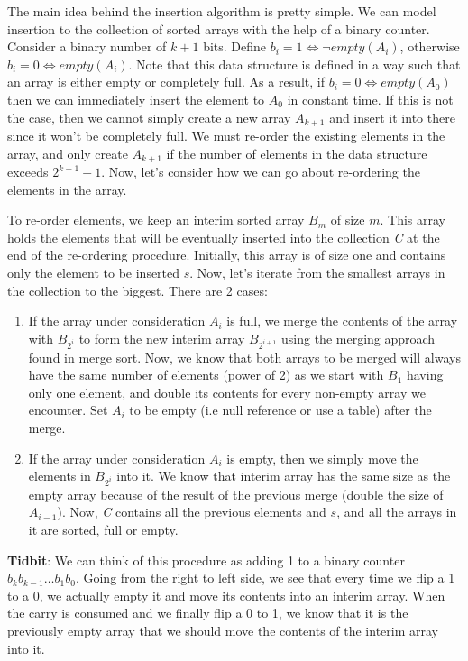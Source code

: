 \documentclass{article}
\begin{document}
The main idea behind the insertion algorithm is pretty simple. We can model insertion to the collection of sorted
arrays with the help of a binary counter. Consider a binary number of $k + 1$ bits.
Define $b_i = 1 \Leftrightarrow \neg empty(A_i)$, otherwise $b_i = 0 \Leftrightarrow empty(A_i)$.
Note that this data structure is defined in a way such that an array is either empty or completely full. As a result,
if $b_i = 0 \Leftrightarrow empty(A_0)$ then we can immediately insert the element to $A_0$ in constant time. If this
is not the case, then we cannot simply create a new array $A_{k+1}$ and insert it into there since it won't be
completely full. We must re-order the existing elements in the array, and only create $A_{k+1}$ if the number
of elements in the data structure exceeds $2^{k+1} - 1$. Now, let's consider how we can go about re-ordering the
elements in the array.

To re-order elements, we keep an interim sorted array $B_m$ of size $m$. This array holds the elements that will be
eventually inserted into the collection \textit{C} at the end of the re-ordering procedure. Initially, this array
is of size one and contains only the element to be inserted $s$. Now, let's iterate from the smallest arrays in the
collection to the biggest. There are 2 cases:

\begin{enumerate}
    \item
        If the array under consideration $A_i$ is full, we merge the contents of the array with $B_{2^i}$ to form the
        new interim array $B_{2^{i+1}}$ using the merging approach found in merge sort.
        Now, we know that both arrays to be merged will  always have the same number of elements (power of 2) as
        we start with $B_1$ having only one element, and double its contents for every non-empty array we encounter.
        Set $A_i$ to be empty (i.e null reference or use a table) after the merge.
    \item
        If the array under consideration $A_i$ is empty, then we simply move the elements in $B_{2^i}$ into it.
        We know that interim array has the same size as the empty array because of the result of the previous merge
        (double the size of $A_{i-1}$). Now, \textit{C} contains all the previous elements and $s$, and all the
        arrays in it are sorted, full or empty.
\end{enumerate}

\textbf{Tidbit}: We can think of this procedure as adding 1 to a binary counter $b_{k}b_{k-1} \ldots b_{1}b_{0}$. Going
from the right to left side, we see that every time we flip a 1 to a 0, we actually empty it and move its contents into
an interim array.  When the carry is consumed and we finally flip a 0 to 1, we know that it is the previously empty
array that we should move the contents of the interim array into it. \newline
\end{document}
